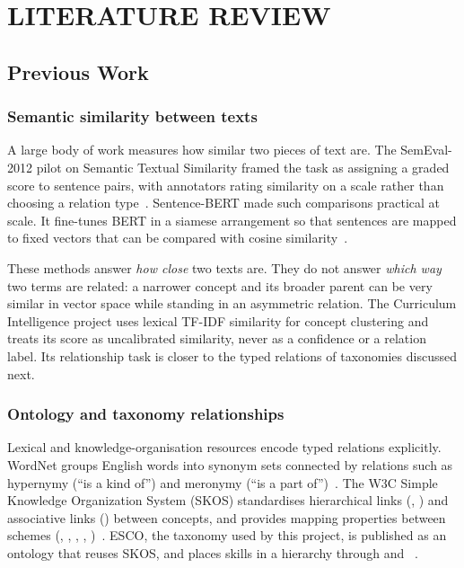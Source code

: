 \chapter{LITERATURE REVIEW}
\label{ch:lit}

\section{Previous Work}
\label{sec:previous}

\subsection{Semantic similarity between texts}

A large body of work measures how similar two pieces of text are. The SemEval-2012 pilot on Semantic Textual Similarity framed the task as assigning a graded score to sentence pairs, with annotators rating similarity on a scale rather than choosing a relation type~\cite{agirre2012}. Sentence-BERT made such comparisons practical at scale. It fine-tunes BERT in a siamese arrangement so that sentences are mapped to fixed vectors that can be compared with cosine similarity~\cite{reimers2019}.

These methods answer \emph{how close} two texts are. They do not answer \emph{which way} two terms are related: a narrower concept and its broader parent can be very similar in vector space while standing in an asymmetric relation. The Curriculum Intelligence project uses lexical TF-IDF similarity for concept clustering and treats its score as uncalibrated similarity, never as a confidence or a relation label. Its relationship task is closer to the typed relations of taxonomies discussed next.

\subsection{Ontology and taxonomy relationships}

Lexical and knowledge-organisation resources encode typed relations explicitly. WordNet groups English words into synonym sets connected by relations such as hypernymy (``is a kind of'') and meronymy (``is a part of'')~\cite{miller1995}. The W3C Simple Knowledge Organization System (SKOS) standardises hierarchical links (, ) and associative links () between concepts, and provides mapping properties between schemes (, , , , )~\cite{miles2009skos}. ESCO, the taxonomy used by this project, is published as an ontology that reuses SKOS, and places skills in a hierarchy through  and ~\cite{esco2024model}.

